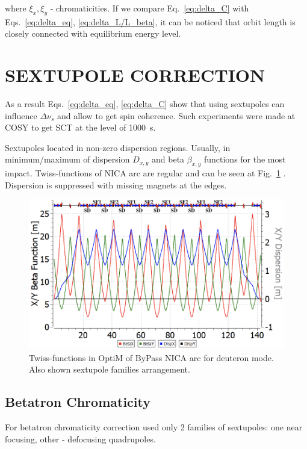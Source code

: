 \documentclass[a4paper]{jpconf}
\begin{document}
\par where $\xi_x, \xi_y$ - chromaticities. If we compare Eq.~\ref{eq:delta_C} with Eqs.~\ref{eq:delta_eq}, \ref{eq:delta_L/L_beta}, it can be noticed that orbit length is closely connected with equilibrium energy level.

\section{SEXTUPOLE CORRECTION}

\par As a result Eqs.~\ref{eq:delta_eq}, \ref{eq:delta_C} show that using sextupoles can influence $\Delta\nu_{s}$ and allow to get spin coherence. Such experiments were made at COSY to get SCT at the level of 1000~s. \cite{COSY}

\par Sextupoles located in non-zero dispersion regions. Usually, in minimum/maximum of dispersion $D_{x, y}$ and  beta $\beta_{x, y}$ functions for the most impact. Twiss-functions of NICA arc are regular and can be seen at Fig.~\ref{fig:ARC} \cite{OptiM}. Dispersion is suppressed with missing magnets at the edges.

\begin{figure}[!h]
   \centering
   \includegraphics*[width=0.951\columnwidth]{fig1}
   \caption{Twiss-functions in OptiM of ByPass NICA arc for deuteron mode. Also shown sextupole families arrangement.}
   \label{fig:ARC}
\end{figure}

\subsection{Betatron Chromaticity}

\par For betatron chromaticity correction used only 2 families of sextupoles:
one near focusing, other - defocusing quadrupoles. 
\end{document}
